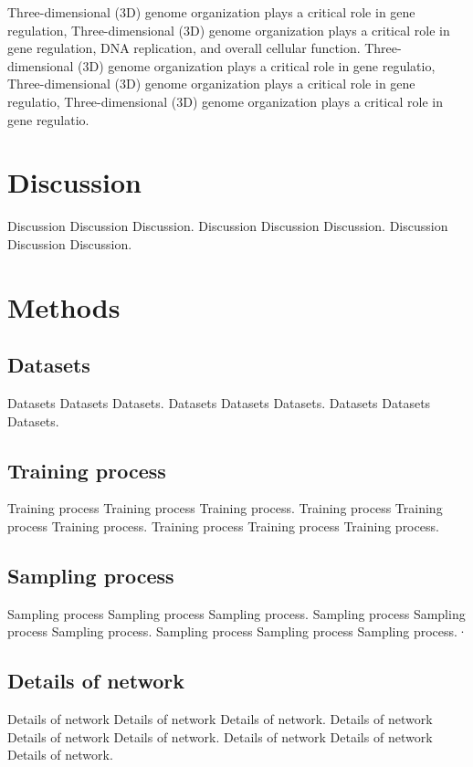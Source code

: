 \documentclass{GR}
\begin{document}
{Three-dimensional (3D) genome organization plays a critical role in gene regulation, Three-dimensional (3D) genome organization plays a critical role in gene regulation, DNA replication, and overall cellular function. Three-dimensional (3D) genome organization plays a critical role in gene regulatio, Three-dimensional (3D) genome organization plays a critical role in gene regulatio, Three-dimensional (3D) genome organization plays a critical role in gene regulatio.


\section*{Discussion}

Discussion Discussion Discussion. Discussion Discussion Discussion. Discussion Discussion Discussion.   


\section*{Methods}
\subsection*{Datasets}

Datasets Datasets Datasets. Datasets Datasets Datasets. Datasets Datasets Datasets.

\subsection*{Training process}

Training process Training process Training process. Training process Training process Training process. Training process Training process Training process.


\subsection*{Sampling process}

Sampling process Sampling process Sampling process. Sampling process Sampling process Sampling process. Sampling process Sampling process Sampling process.·


\subsection*{Details of network}

Details of network Details of network Details of network. Details of network Details of network Details of network. Details of network Details of network Details of network.

}
\end{document}

